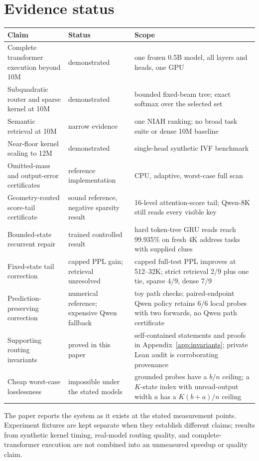 \documentclass[11pt]{article}
\numberwithin{equation}{section}
\begin{document}
\section*{Evidence status}
\begin{center}\small
\begin{tabularx}{\textwidth}{@{}lXX@{}}
\toprule
Claim & Status & Scope\\
\midrule
Complete transformer execution beyond 10M & demonstrated & one frozen 0.5B model, all layers and heads, one GPU\\
Subquadratic router and sparse kernel at 10M & demonstrated & bounded fixed-beam tree; exact softmax over the selected set\\
Semantic retrieval at 10M & narrow evidence & one NIAH ranking; no broad task suite or dense 10M baseline\\
Near-floor kernel scaling to 12M & demonstrated & single-head synthetic IVF benchmark\\
Omitted-mass and output-error certificates & reference implementation & CPU, adaptive, worst-case full scan\\
Geometry-routed score-tail certificate & sound reference, negative sparsity result & 16-level attention-score tail; Qwen-8K still reads every visible key\\
Bounded-state recurrent repair & trained controlled result & hard token-tree GRU reads reach 99.935\% on fresh 4K address tasks with supplied clues\\
Fixed-state tail correction & capped PPL gain; retrieval unresolved & capped full-test PPL improves at 512--32K; strict retrieval 2/9 plus one tie, sparse 4/9, dense 7/9\\
Prediction-preserving correction & numerical reference; expensive Qwen fallback & toy path checks; paired-endpoint Qwen policy retains 6/6 local probes with two forwards, no Qwen path certificate\\
Supporting routing invariants & proved in this paper & self-contained statements and proofs in Appendix~\ref{app:invariants}; private Lean audit is corroborating provenance\\
Cheap worst-case losslessness & impossible under the stated models & grounded probes have a $b/n$ ceiling; a $K$-state index with unread-output width $a$ has a $K(b+a)/n$ ceiling\\
\bottomrule
\end{tabularx}
\end{center}

The paper reports the system as it exists at the stated measurement points. Experiment fixtures are kept
separate when they establish different claims; results from synthetic kernel timing, real-model routing
quality, and complete-transformer execution are not combined into an unmeasured speedup or quality claim.
\end{document}
